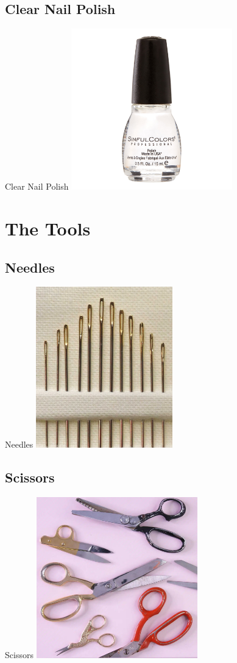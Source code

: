 \documentclass[aspectratio=169]{beamer}
\begin{document}
\subsection{Clear Nail Polish}
\begin{frame}[fragile]{Clear Nail Polish}
\includegraphics[height=2.75in]{ClearNailPolish.jpeg}
\end{frame}
\section{The Tools}
\frame{\tableofcontents[hideothersubsections,sectionstyle=show/hide]}
\subsection{Needles}
\begin{frame}[fragile]{Needles}
\includegraphics[height=2.75in]{Needles.jpg}
\end{frame}
\subsection{Scissors}
\begin{frame}[fragile]{Scissors}
\includegraphics[height=2.75in]{Scissors.jpg}
\end{frame}
\end{document}
